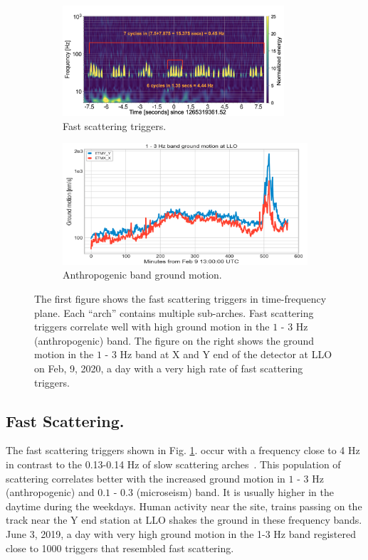 \documentclass[12pt]{iopart}
\begin{document}
\begin{figure}[h]
\captionsetup[subfigure]{font=scriptsize,labelfont=scriptsize}
   \centering
    \begin{subfigure}[b]{0.45\textwidth}
        \centering
         \includegraphics[width=\textwidth,height=4.1cm]{fast_scat8.png}
         \caption{Fast scattering triggers.}
         \label{fig:fastscat}
    \end{subfigure}
    \hfill
    \begin{subfigure}[b]{0.5\textwidth}
        \centering
         \includegraphics[width=\textwidth]{anthro_motion.png}
         \caption{Anthropogenic band ground motion.}
         \label{fig:timeseriessus}
         
    
    \end{subfigure}
    \caption{The first figure shows the fast scattering triggers in time-frequency plane. Each ``arch'' contains multiple sub-arches. Fast scattering triggers correlate well with high ground motion in the $1$ - $3$ Hz (anthropogenic) band. The figure on the right shows the ground motion in the $1$ - $3$ Hz band at X and Y end of the detector at LLO on Feb, 9, 2020, a day with a very high rate of fast scattering triggers. }
    \label{fig:Fast_scattering}
    
\end{figure}


\subsection{Fast Scattering.}
The fast scattering triggers shown in Fig. \ref{fig:fastscat}. occur with a frequency close to 4 Hz in contrast to the 0.13-0.14 Hz of slow scattering arches~\cite{alogjosh}. This population of scattering correlates better with the increased ground motion in  $1$ - $3$ Hz (anthropogenic) and $0.1$ - $0.3$ (microseism) band. It is usually higher in the daytime during the weekdays. Human activity near the site, trains passing on the track near the Y end station at LLO shakes the ground in these frequency bands. June 3, 2019, a day with very high ground motion in the 1-3 Hz band registered close to 1000 triggers that resembled fast scattering. 
\end{document}
